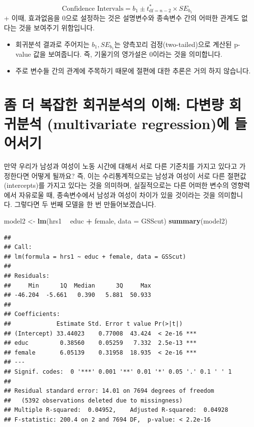 \documentclass[]{book}
\newenvironment{Shaded}{\begin{snugshade}}{\end{snugshade}}
\newcommand{\DataTypeTok}[1]{\textcolor[rgb]{0.13,0.29,0.53}{#1}}
\newcommand{\KeywordTok}[1]{\textcolor[rgb]{0.13,0.29,0.53}{\textbf{#1}}}
\newcommand{\NormalTok}[1]{#1}
\newcommand{\OperatorTok}[1]{\textcolor[rgb]{0.81,0.36,0.00}{\textbf{#1}}}
\newcommand{\StringTok}[1]{\textcolor[rgb]{0.31,0.60,0.02}{#1}}
\begin{document}
\[ \text{Confidence Intervals} = b_1 \pm t^{*}_{\text{df} = n-2} \times SE_{b_1}\]
+ 이때, 효과없음을 0으로 설정하는 것은 설명변수와 종속변수 간의 어떠한 관계도 없다는 것을 보여주기 위함입니다.

\begin{itemize}
\item
  회귀분석 결과로 주어지는 \(b_1, SE_{b_1}\)는 양측꼬리 검정(two-tailed)으로 계산된 p-value 값을 보여줍니다. 즉, 기울기의 영가설은 0이라는 것을 의미합니다.
\item
  주로 변수들 간의 관계에 주목하기 때문에 절편에 대한 추론은 거의 하지 않습니다.
\end{itemize}

\hypertarget{uxc880-uxb354-uxbcf5uxc7a1uxd55c-uxd68cuxadc0uxbd84uxc11duxc758-uxc774uxd574-uxb2e4uxbcc0uxb7c9-uxd68cuxadc0uxbd84uxc11d-multivariate-regressionuxc5d0-uxb4e4uxc5b4uxc11cuxae30}{%
\section{좀 더 복잡한 회귀분석의 이해: 다변량 회귀분석 (multivariate regression)에 들어서기}\label{uxc880-uxb354-uxbcf5uxc7a1uxd55c-uxd68cuxadc0uxbd84uxc11duxc758-uxc774uxd574-uxb2e4uxbcc0uxb7c9-uxd68cuxadc0uxbd84uxc11d-multivariate-regressionuxc5d0-uxb4e4uxc5b4uxc11cuxae30}}

만약 우리가 남성과 여성이 노동 시간에 대해서 서로 다른 기준치를 가지고 있다고 가정한다면 어떻게 될까요? 즉, 이는 수리통계적으로는 남성과 여성이 서로 다른 절편값(intercepts)를 가지고 있다는 것을 의미하며, 실질적으로는 다른 어떠한 변수의 영향력에서 자유로울 때, 종속변수에서 남성과 여성이 차이가 있을 것이라는 것을 의미합니다. 그렇다면 두 번째 모델을 한 번 만들어보겠습니다.

\begin{Shaded}
\begin{Highlighting}[]
\NormalTok{model2 <-}\StringTok{ }\KeywordTok{lm}\NormalTok{(hrs1 }\OperatorTok{~}\StringTok{ }\NormalTok{educ }\OperatorTok{+}\StringTok{ }\NormalTok{female, }\DataTypeTok{data =}\NormalTok{ GSScut)}
\KeywordTok{summary}\NormalTok{(model2)}
\end{Highlighting}
\end{Shaded}

\begin{verbatim}
## 
## Call:
## lm(formula = hrs1 ~ educ + female, data = GSScut)
## 
## Residuals:
##     Min      1Q  Median      3Q     Max 
## -46.204  -5.661   0.390   5.881  50.933 
## 
## Coefficients:
##             Estimate Std. Error t value Pr(>|t|)    
## (Intercept) 33.44023    0.77008  43.424  < 2e-16 ***
## educ         0.38560    0.05259   7.332  2.5e-13 ***
## female       6.05139    0.31958  18.935  < 2e-16 ***
## ---
## Signif. codes:  0 '***' 0.001 '**' 0.01 '*' 0.05 '.' 0.1 ' ' 1
## 
## Residual standard error: 14.01 on 7694 degrees of freedom
##   (5392 observations deleted due to missingness)
## Multiple R-squared:  0.04952,    Adjusted R-squared:  0.04928 
## F-statistic: 200.4 on 2 and 7694 DF,  p-value: < 2.2e-16
\end{verbatim}
\end{document}
